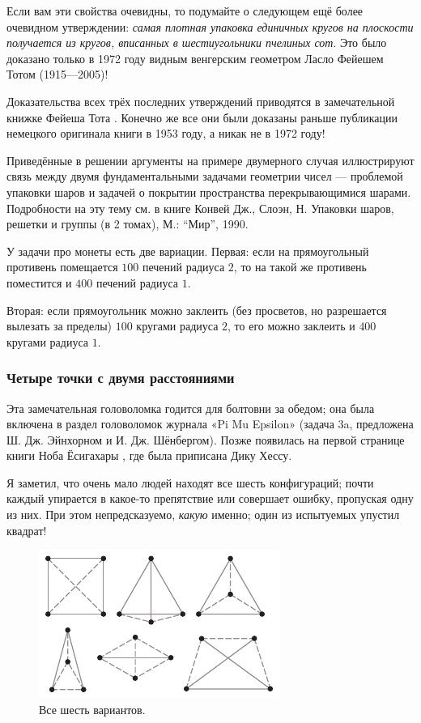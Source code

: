 Если вам эти свойства очевидны, то подумайте о следующем ещё более очевидном утверждении: \emph{самая плотная упаковка единичных кругов на  плоскости получается из кругов, вписанных в шестиугольники пчелиных сот}.
Это было доказано только в 1972 году видным венгерским геометром Ласло Фейешем Тотом (1915---2005)!

\begin{addedbytheeditors}
Доказательства всех трёх последних утверждений приводятся в замечательной книжке Фейеша Тота \cite[III §3]{tot}.
Конечно же все они были доказаны раньше публикации немецкого оригинала книги в 1953 году, а никак не в 1972 году!

Приведённые в решении аргументы на примере двумерного случая иллюстрируют связь между двумя фундаментальными задачами геометрии чисел --- проблемой упаковки шаров и задачей о покрытии пространства перекрывающимися шарами. Подробности на эту тему см. в книге Конвей Дж.,  Слоэн, Н. Упаковки шаров, решетки и группы (в 2 томах), М.: ``Мир'', 1990. 

У задачи про монеты есть две вариации. Первая: если на прямоугольный противень помещается $100$ печений радиуса $2$, то  на такой же противень поместится и $400$ печений радиуса $1$.

Вторая: если прямоугольник можно заклеить (без просветов, но разрешается вылезать за пределы) $100$ кругами радиуса $2$, то его можно заклеить и $400$ кругами радиуса $1$.
\pr
\end{addedbytheeditors}

\subsubsection*{Четыре точки с двумя расстояниями}

Эта замечательная головоломка годится для болтовни за обедом;
она была включена в раздел головоломок журнала «Pi Mu Epsilon» \cite[1985 год]{16} (задача 3a, предложена Ш. Дж. Эйнхорном и И. Дж. Шёнбергом).
Позже появилась на первой странице книги Ноба Ёсигахары \cite{61}, где была приписана Дику Хессу.

Я заметил, что очень мало людей находят все шесть конфигураций;
почти каждый упирается в какое-то препятствие или совершает ошибку, пропуская одну из них.
При этом непредсказуемо, \emph{какую} именно; один из испытуемых упустил квадрат!

\begin{figure}[ht!]
\centering
\includegraphics[scale=1]{pics/2dist}
\caption{Все шесть вариантов.}
\label{pic:2dist}
\end{figure}

